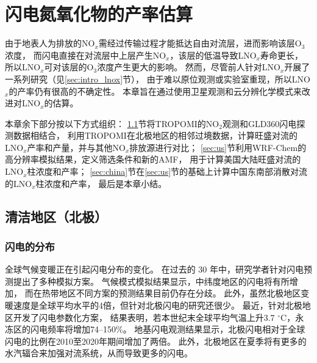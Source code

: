 
\chapter{闪电氮氧化物的产率估算} \label{chapter:PE}

由于地表人为排放的NO$_x$需经过传输过程才能抵达自由对流层，进而影响该层O$_3$浓度，
而闪电直接在对流层中上层产生NO$_x$，该层的低温导致LNO$_x$寿命更长，
所以LNO$_x$可对该层的O$_3$浓度产生更大的影响。
然而，尽管前人针对LNO$_x$开展了一系列研究（见\ref{sec:intro_lnox}节），
由于难以原位观测或实验室重现，所以LNO$_x$的产率仍有很高的不确定性。
本章旨在通过使用卫星观测和云分辨化学模式来改进对LNO$_x$的估算。

本章余下部分按以下方式组织：
\ref{sec:arctic}节将TROPOMI的NO$_2$观测和GLD360闪电探测数据相结合，
利用TROPOMI在北极地区的相邻过境数据，计算旺盛对流的LNO$_x$产率和产量，并与其他NO$_x$排放源进行对比；
\ref{sec:us}节利用WRF-Chem的高分辨率模拟结果，定义筛选条件和新的AMF，
用于计算美国大陆旺盛对流的LNO$_x$柱浓度和产率；
\ref{sec:china}节在\ref{sec:us}节的基础上计算中国东南部消散对流的LNO$_x$柱浓度和产率，
最后是本章小结。


\section{清洁地区（北极）} \label{sec:arctic}

\subsection{闪电的分布} \label{subsect:lightning_distribution}

全球气候变暖正在引起闪电分布的变化\citep{Reeve.1999,Williams.2005a,Price.2009a}。
在过去的 30 年中，研究学者针对闪电预测提出了多种模拟方案\citep{Price.1992,Price.1997b,Allen.2002,Futyan.2007,Finney.2014,Romps.2014}。
气候模式模拟结果显示，中纬度地区的闪电将有所增加\citep{Michalon.1999,Romps.2014,Luhar.2021}，
而在热带地区不同方案的预测结果目前仍存在分歧\citep{Finney.2018,Romps.2019}。
此外，虽然北极地区变暖速度是全球平均水平的4倍\citep{Rantanen.2022}，但针对北极闪电的研究还很少。
最近，\citet{Chen.2021a}针对北极地区开发了闪电参数化方案，
结果表明，若本世纪末全球平均气温上升3.7 $^{\circ}$C，永冻区的闪电频率将增加74--150\%。
地基闪电观测结果显示，北极闪电相对于全球闪电的比例在2010至2020年期间增加了两倍\citep{Holzworth.2021}。
此外，北极地区在夏季将有更多的水汽辐合来加强对流系统，从而导致更多的闪电\citep{Bintanja.2020}。

